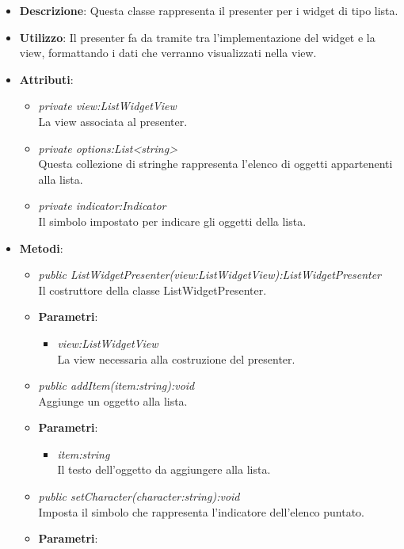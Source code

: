 \begin{itemize}
\item \textbf{Descrizione}: Questa classe rappresenta il presenter per i widget di tipo lista.
\item \textbf{Utilizzo}: Il presenter fa da tramite tra l'implementazione del widget e la view, formattando i dati che verranno visualizzati nella view.
\item \textbf{Attributi}:
	\begin{itemize}
	\item \textit{private view:ListWidgetView}\\
	La view associata al presenter.
	\item \textit{private options:List<string>}\\
	Questa collezione di stringhe rappresenta l'elenco di oggetti appartenenti alla lista.
	\item \textit{private indicator:Indicator}\\
	Il simbolo impostato per indicare gli oggetti della lista.
	\end{itemize}
\item \textbf{Metodi}:
	\begin{itemize}
	\item \textit{public ListWidgetPresenter(view:ListWidgetView):ListWidgetPresenter}\\
	Il costruttore della classe ListWidgetPresenter.
		\item{\textbf{Parametri}: \begin{itemize}
		\item \textit{view:ListWidgetView}\\
		La view necessaria alla costruzione del presenter.
		\end{itemize}}
	\item \textit{public addItem(item:string):void}\\
	Aggiunge un oggetto alla lista.
		\item{\textbf{Parametri}: \begin{itemize}
		\item \textit{item:string}\\
		Il testo dell'oggetto da aggiungere alla lista.
		\end{itemize}}
	\item \textit{public setCharacter(character:string):void}\\
	Imposta il simbolo che rappresenta l'indicatore dell'elenco puntato.
		\item{\textbf{Parametri}: \begin{itemize}

\end{itemize}}
\end{itemize}
\end{itemize}
